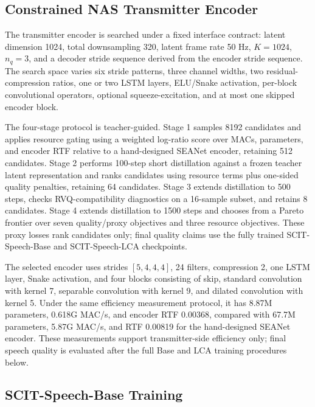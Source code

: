 \documentclass[10pt,twocolumn]{article}
\newcommand{\base}{SCIT-Speech-Base}
\newcommand{\lca}{SCIT-Speech-LCA}
\begin{document}
\subsection{Constrained NAS Transmitter Encoder}

The transmitter encoder is searched under a fixed interface contract: latent dimension 1024, total downsampling 320, latent frame rate 50 Hz, \(K=1024\), \(n_q=3\), and a decoder stride sequence derived from the encoder stride sequence. The search space varies six stride patterns, three channel widths, two residual-compression ratios, one or two LSTM layers, ELU/Snake activation, per-block convolutional operators, optional squeeze-excitation, and at most one skipped encoder block.

The four-stage protocol is teacher-guided. Stage 1 samples 8192 candidates and applies resource gating using a weighted log-ratio score over MACs, parameters, and encoder RTF relative to a hand-designed SEANet encoder, retaining 512 candidates. Stage 2 performs 100-step short distillation against a frozen teacher latent representation and ranks candidates using resource terms plus one-sided quality penalties, retaining 64 candidates. Stage 3 extends distillation to 500 steps, checks RVQ-compatibility diagnostics on a 16-sample subset, and retains 8 candidates. Stage 4 extends distillation to 1500 steps and chooses from a Pareto frontier over seven quality/proxy objectives and three resource objectives. These proxy losses rank candidates only; final quality claims use the fully trained \base{} and \lca{} checkpoints.

The selected encoder uses strides \([5,4,4,4]\), 24 filters, compression 2, one LSTM layer, Snake activation, and four blocks consisting of skip, standard convolution with kernel 7, separable convolution with kernel 9, and dilated convolution with kernel 5. Under the same efficiency measurement protocol, it has 8.87M parameters, 0.618G MAC/s, and encoder RTF 0.00368, compared with 67.7M parameters, 5.87G MAC/s, and RTF 0.00819 for the hand-designed SEANet encoder. These measurements support transmitter-side efficiency only; final speech quality is evaluated after the full Base and LCA training procedures below.

\subsection{\base{} Training}
\end{document}
